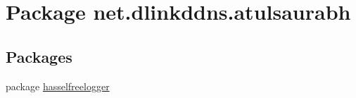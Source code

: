\hypertarget{namespacenet_1_1dlinkddns_1_1atulsaurabh}{}\section{Package net.\+dlinkddns.\+atulsaurabh}
\label{namespacenet_1_1dlinkddns_1_1atulsaurabh}
\subsection*{Packages}
\begin{DoxyCompactItemize}
\item 
package \mbox{\hyperlink{namespacenet_1_1dlinkddns_1_1atulsaurabh_1_1hasselfreelogger}{hasselfreelogger}}
\end{DoxyCompactItemize}

